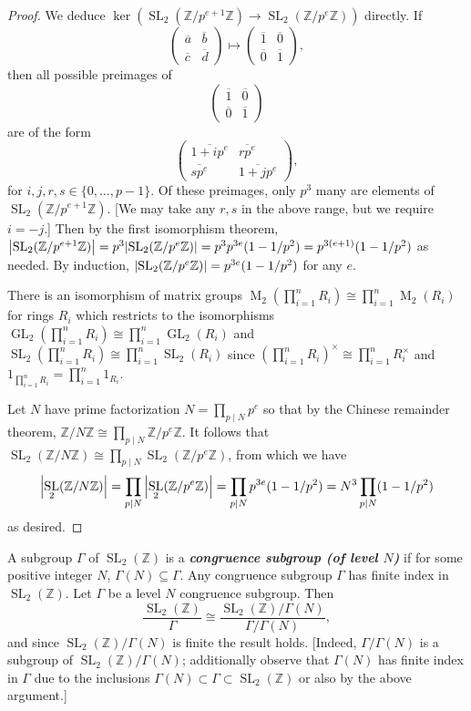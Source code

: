 \documentclass[10pt,leqno]{article}
\newcommand{\textib}[1]{\textbf{\textit{#1}}}
\DeclareMathOperator{\Mat}{M}
\DeclareMathOperator{\GL}{GL}
\DeclareMathOperator{\SL}{SL}
\begin{document}
\begin{proof}
    We deduce $\ker(\SL_2(\mathbb{Z}/p^{e+1}\mathbb{Z})\to \SL_2(\mathbb{Z}/p^e\mathbb{Z}))$ directly. If \[\begin{pmatrix}
        \overline a & \overline b \\ \overline c & \overline d
    \end{pmatrix}\mapsto \begin{pmatrix}
        \overline 1 & \overline 0 \\ \overline 0 & \overline 1
    \end{pmatrix},\] then all possible preimages of \[\begin{pmatrix}
        \overline 1 & \overline 0 \\ \overline 0 & \overline 1
    \end{pmatrix}\] are of the form \[\begin{pmatrix}
        \overline{1+ip^e} & \overline{rp^e} \\ \overline{sp^e} & \overline{1+jp^e}
    \end{pmatrix},\] for $i,j,r,s\in \{0,\dots,p-1\}$. Of these preimages, only $p^3$ many are elements of $\SL_2(\mathbb{Z}/p^{e+1}\mathbb{Z})$. [We may take any $r,s$ in the above range, but we require $i=-j$.] Then by the first isomorphism theorem, $\abs{\SL_2(\mathbb{Z}/p^{e+1}\mathbb{Z})} = p^3\abs{\SL_2(\mathbb{Z}/p^e\mathbb{Z})} = p^3p^{3e}(1-1/p^2) = p^{3(e+1)}(1-1/p^2)$ as needed. By induction, $\abs{\SL_2(\mathbb{Z}/p^e\mathbb{Z})} = p^{3e}(1-1/p^2)$ for any $e$.

    There is an isomorphism of matrix groups $\Mat_2(\prod_{i=1}^nR_i)\cong \prod_{i=1}^n\Mat_2(R_i)$ for rings $R_i$ which restricts to the isomorphisms $\GL_2(\prod_{i=1}^nR_i)\cong \prod_{i=1}^n\GL_2(R_i)$ and $\SL_2(\prod_{i=1}^nR_i)\cong \prod_{i=1}^n\SL_2(R_i)$ since $(\prod_{i=1}^nR_i)^\times\cong \prod_{i=1}^nR_i^\times$ and $1_{\prod_{i=1}^nR_i} = \prod_{i=1}^n1_{R_i}$.

    Let $N$ have prime factorization $N = \prod_{p\mid N} p^{e}$ so that by the Chinese remainder theorem, $\mathbb{Z}/N\mathbb{Z}\cong \prod_{p\mid N}\mathbb{Z}/p^{e}\mathbb{Z}$. It follows that $\SL_2(\mathbb{Z}/N\mathbb{Z})\cong \prod_{p\mid N}\SL_2(\mathbb{Z}/p^{e}\mathbb{Z})$, from which we have \[\abs{\SL_2(\mathbb{Z}/N\mathbb{Z})}= \prod_{p\mid N}\abs{\SL_2(\mathbb{Z}/p^{e}\mathbb{Z})} = \prod_{p\mid N}p^{3e}(1-1/p^2) = N^3\prod_{p\mid N}(1-1/p^2)\] as desired.
\end{proof}

A subgroup $\varGamma$ of $\SL_2(\mathbb{Z})$ is a \textib{congruence subgroup (of level $N$)} if for some positive integer $N$, $\varGamma(N)\subseteq \varGamma$. Any congruence subgroup $\varGamma$ has finite index in $\SL_2(\mathbb{Z})$. Let $\varGamma$ be a level $N$ congruence subgroup. Then 
\[\frac{\SL_2(\mathbb{Z})}{\varGamma}\cong \frac{\SL_2(\mathbb{Z})/\varGamma(N)}{\varGamma/\varGamma(N)},\] and since $\SL_2(\mathbb{Z})/\varGamma(N)$ is finite the result holds. [Indeed, $\varGamma/\varGamma(N)$ is a subgroup of $\SL_2(\mathbb{Z})/\varGamma(N)$; additionally observe that $\varGamma(N)$ has finite index in $\varGamma$ due to the inclusions $\varGamma(N)\subset \varGamma \subset \SL_2(\mathbb{Z})$ or also by the above argument.]
\end{document}
